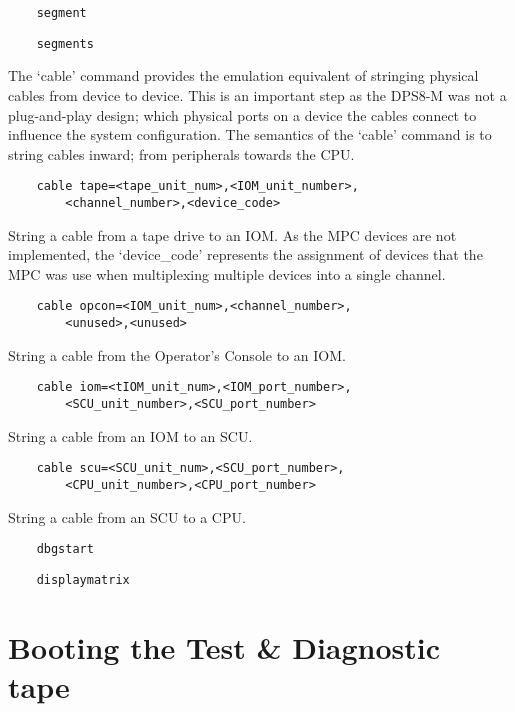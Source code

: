 \documentclass[notitlepage]{report}
\begin{document}
\begin{lstlisting}
	segment
\end{lstlisting}

\begin{lstlisting}
	segments
\end{lstlisting}

The `cable' command provides the emulation equivalent of stringing physical cables from device to device. This is an important step as the DPS8-M was not a plug-and-play design; which physical ports on a device the cables connect to influence the system configuration. The semantics of the `cable' command is to string cables inward; from peripherals towards the CPU.
\begin{lstlisting}
	cable tape=<tape_unit_num>,<IOM_unit_number>,
		<channel_number>,<device_code>
\end{lstlisting}
	String a cable from a tape drive to an IOM. As the MPC devices are not implemented, the `device\_code' represents the assignment of devices that the MPC was use when multiplexing multiple devices into a single channel.

\begin{lstlisting}
	cable opcon=<IOM_unit_num>,<channel_number>,
		<unused>,<unused>
\end{lstlisting}

	String a cable from the Operator's Console to an IOM.

\begin{lstlisting}
	cable iom=<tIOM_unit_num>,<IOM_port_number>,
		<SCU_unit_number>,<SCU_port_number>
\end{lstlisting}

	String a cable from an IOM to an SCU.

\begin{lstlisting}
	cable scu=<SCU_unit_num>,<SCU_port_number>,
		<CPU_unit_number>,<CPU_port_number>
\end{lstlisting}

	String a cable from an SCU to a CPU.

\begin{lstlisting}
	dbgstart
\end{lstlisting}

\begin{lstlisting}
	displaymatrix
\end{lstlisting}


\section{Booting the Test \& Diagnostic tape}
\end{document}
